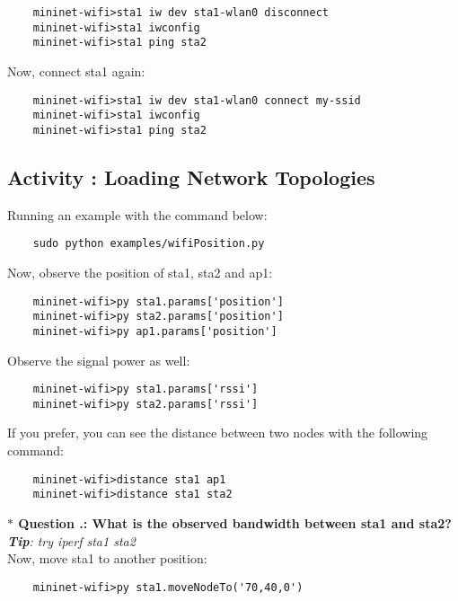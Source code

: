 \begin{verbatim}
    mininet-wifi>sta1 iw dev sta1-wlan0 disconnect
    mininet-wifi>sta1 iwconfig
    mininet-wifi>sta1 ping sta2
\end{verbatim}


\noindent Now, connect sta1 again: 

\begin{verbatim}
    mininet-wifi>sta1 iw dev sta1-wlan0 connect my-ssid
    mininet-wifi>sta1 iwconfig
    mininet-wifi>sta1 ping sta2
\end{verbatim}


\subsection{Activity \themycounter{}: Loading Network Topologies}

\noindent Running an example with the command below:
\begin{verbatim}
    sudo python examples/wifiPosition.py
\end{verbatim}


\noindent Now, observe the position of sta1, sta2 and ap1:
\begin{verbatim}
    mininet-wifi>py sta1.params['position']
    mininet-wifi>py sta2.params['position']
    mininet-wifi>py ap1.params['position']
\end{verbatim}



\noindent Observe the signal power as well:
\begin{verbatim}
    mininet-wifi>py sta1.params['rssi']
    mininet-wifi>py sta2.params['rssi']
\end{verbatim}


\noindent If you prefer, you can see the distance between two nodes with the following command:

\begin{verbatim}
    mininet-wifi>distance sta1 ap1
    mininet-wifi>distance sta1 sta2   
\end{verbatim}


\noindent \textbf{$\ast$ Question \themycounter.\thequestion{}: What is the observed bandwidth between sta1 and sta2?}
\\\textit{\textbf{Tip}: try iperf sta1 sta2}
\\

\noindent Now, move sta1 to another position:
\begin{verbatim}
    mininet-wifi>py sta1.moveNodeTo('70,40,0')
\end{verbatim}


